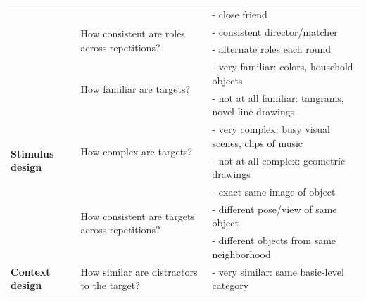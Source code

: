 \documentclass[11pt, floatsintext]{apa6}
\begin{document}
\begin{table}[th!]
{\begin{tabular}{@{}lll@{}}
                                            &                                                                 & - close friend                                                    \\ \cmidrule(l){2-3}                                             
                                            & \multirow{2}{*}{How consistent are roles across repetitions?}   & - consistent director/matcher                                              \\
                                            &                                                                 & - alternate roles each round                                               \\ \midrule
\multirow{7}{*}{\textbf{Stimulus design}}   & \multirow{2}{*}{How familiar are targets?}                      & - very familiar: colors, household objects                                 \\
                                            &                                                                 & - not at all familiar: tangrams, novel line drawings                       \\ \cmidrule(l){2-3} 
                                            & \multirow{2}{*}{How complex are targets?}                       & - very complex: busy visual scenes, clips of music                         \\
                                            &                                                                 & - not at all complex: geometric drawings                                   \\ \cmidrule(l){2-3} 
                                            & \multirow{3}{*}{How consistent are targets across repetitions?} & - exact same image of object                                               \\
                                            &                                                                 & - different pose/view of same object                                       \\
                                            &                                                                 & - different objects from same neighborhood                                 \\ \midrule
\multirow{5}{*}{\textbf{Context design}}    & \multirow{2}{*}{How similar are distractors to the target?}     & - very similar: same basic-level category                                  \\

\end{tabular}}
\end{table}
\end{document}
